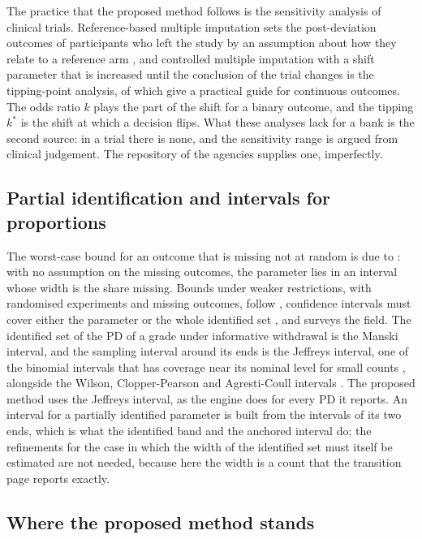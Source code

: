 The practice that the proposed method follows is the sensitivity analysis of clinical trials. Reference-based multiple imputation sets the post-deviation outcomes of participants who left the study by an assumption about how they relate to a reference arm \citep{carpenter2013}, and controlled multiple imputation with a shift parameter that is increased until the conclusion of the trial changes is the tipping-point analysis, of which \citet{cro2020} give a practical guide for continuous outcomes. The odds ratio $k$ plays the part of the shift for a binary outcome, and the tipping $k^{*}$ is the shift at which a decision flips. What these analyses lack for a bank is the second source: in a trial there is none, and the sensitivity range is argued from clinical judgement. The repository of the agencies supplies one, imperfectly.

\subsection{Partial identification and intervals for proportions}

The worst-case bound for an outcome that is missing not at random is due to \citet{manski1989}: with no assumption on the missing outcomes, the parameter lies in an interval whose width is the share missing. Bounds under weaker restrictions, with randomised experiments and missing outcomes, follow \citep{horowitz2000}, confidence intervals must cover either the parameter or the whole identified set \citep{imbens2004,chernozhukov2007}, and \citet{tamer2010} surveys the field. The identified set of the PD of a grade under informative withdrawal is the Manski interval, and the sampling interval around its ends is the Jeffreys interval, one of the binomial intervals that has coverage near its nominal level for small counts \citep{brown2001}, alongside the Wilson, Clopper-Pearson and Agresti-Coull intervals \citep{wilson1927,clopper1934,agresti1998}. The proposed method uses the Jeffreys interval, as the engine does for every PD it reports. An interval for a partially identified parameter is built from the intervals of its two ends, which is what the identified band and the anchored interval do; the refinements for the case in which the width of the identified set must itself be estimated are not needed, because here the width is a count that the transition page reports exactly.

\subsection{Where the proposed method stands}

